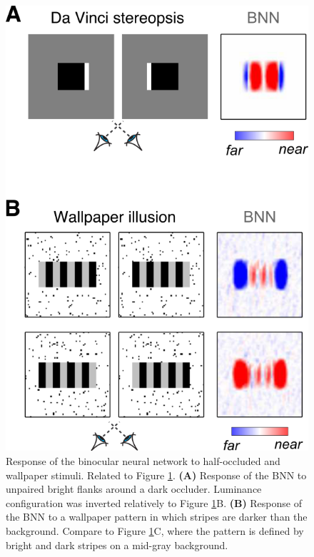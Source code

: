{\begin{figure}[!h]
  \label{fig:c1f6}
\end{figure}

\begin{figure}[!h]
  \centering
  \includegraphics{FigS5.png}
  \caption[Half-occlusions and ambiguous stimuli.]{Response of the binocular neural network to half-occluded and wallpaper stimuli. Related to Figure \ref{fig:c1f6}. \textbf{(A)} Response of the BNN to unpaired bright flanks around a dark occluder. Luminance configuration was inverted relatively to Figure \ref{fig:c1f6}B. \textbf{(B)} Response of the BNN to a wallpaper pattern in which stripes are darker than the background. Compare to Figure \ref{fig:c1f6}C, where the pattern is defined by bright and dark stripes on a mid-gray background.}
  \label{fig:c1fs5}
\end{figure}

}
